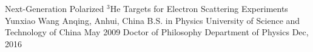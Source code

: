 \documentclass[pdftex,letterpaper,12pt]{report}
\begin{document}
	

\thesistitle
{Next-Generation Polarized $^3$He Targets for Electron Scattering Experiments}                                                %
{Yunxiao Wang}                                               %
{Anqing, Anhui, China}                               %
{B.S. in Physics University of Science and Technology of China May 2009} %
{Doctor of Philosophy}                                 %
{Department of Physics}                                %
{Dec, 2016}  











%
%
%
%
%



% 
	
\end{document}
